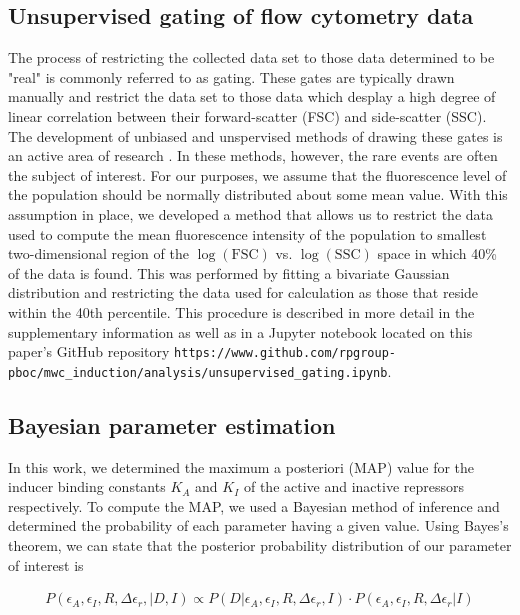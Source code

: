 \subsection*{Unsupervised gating of flow cytometry data}
The process of restricting the collected data set to those data determined to
be  "real" is commonly referred to as gating. These gates are typically drawn
manually \cite{Maecker2005} and restrict the data set to those data which
desplay a high degree of linear correlation  between their forward-scatter
(FSC) and side-scatter (SSC). The development of unbiased and unspervised
methods of drawing these gates is an active area of research
\cite{Agaheepour2013, Lo2008}. In these methods, however, the rare events are
often the subject of interest. For our purposes, we assume that the
fluorescence level of the population should be normally distributed about some
mean value. With this  assumption in place, we developed a method that allows
us to restrict the data used  to compute the mean fluorescence intensity of the
population to smallest two-dimensional  region of the $\log(\mathrm{FSC})$ vs.
$\log(\mathrm{SSC})$ space in which 40\% of the data is found. This  was
performed by fitting a bivariate Gaussian distribution and restricting the
data used for calculation as those that reside within the 40th percentile.
 This procedure is  described in
more detail in the supplementary information as well as in a  Jupyter notebook
located on this paper's GitHub repository
\texttt{https://www.github.com/rpgroup-pboc/mwc\_induction/analysis/unsupervised\_gating.ipynb}.

\subsection*{Bayesian parameter estimation}
In this work, we determined the maximum a posteriori (MAP) value for
the inducer binding constants $K_A$ and $K_I$ of the active and inactive
repressors respectively. To compute the MAP, we used a Bayesian method of
inference and determined the probability of each parameter having a given
value. Using Bayes's theorem, we can state that the posterior probability
distribution of our parameter of interest is

\begin{align}
P(\epsilon_A, \epsilon_I, R, \Delta\epsilon_r, \vert D, I) \propto P(D \vert
\epsilon_A, \epsilon_I, R, \Delta\epsilon_r, I)\cdot P(\epsilon_A, \epsilon_I,
R, \Delta\epsilon_r \vert I)
\end{align}

